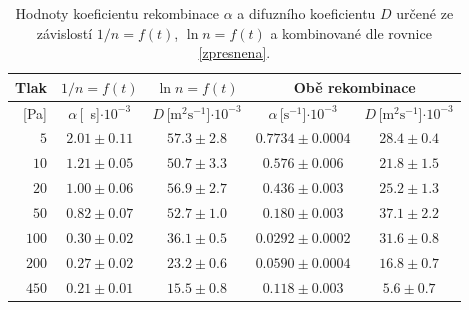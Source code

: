 \documentclass[a4paper,12pt]{article}
\begin{document}
\begin{table}[h]
	\centering
	\caption{Hodnoty koeficientu rekombinace $\alpha$ a difuzního koeficientu 
	$D$ určené ze závislostí $1/n = f(t)$, $\ln n = f(t)$ a kombinované dle 
	rovnice \eqref{zpresnena}.}
	\label{table:koef}
	\begin{tabular}{|r|c|c|c|c|}
		\hline
		Tlak    & $1/n = f(t)$      & $\ln n = f(t)$ & 
		\multicolumn{2}{c|}{Obě rekombinace}                                \\ 
		\hline
		{[}Pa{]} & 
		$\alpha$\,[\si{\per\second}]$\cdot10^{-3}$ & 
		$D$\,[$\si{\metre^2\second^{-1}}$]$\cdot10^{-3}$              & 
		$\alpha$\,[$\si{\second^{-1}}$]$\cdot10^{-3}$ & 
		$D$\,[$\si{\metre^2\second^{-1}}$]$\cdot10^{-3}$ \\ 
		\hline
		$5$                              &$ 2.01                 \pm 
		0.11                $&$ 57.3              \pm  2.8              $& 
		$0.7734    
		\pm 0.0004    $&$ 28.4       \pm  0.4       $\\ \hline
		$10$                             & $1.21                 \pm  
		0.05                $&$ 50.7              \pm  3.3              $&$ 
		0.576     
		\pm 0.006     $&$ 21.8       \pm  1.5       $\\ \hline
		$20                             $&$ 1.00                 \pm  
		0.06                $&$ 56.9              \pm  2.7              $&$ 
		0.436     
		\pm 0.003     $&$ 25.2       \pm  1.3       $\\ \hline
		$50                             $&$ 0.82                 \pm  
		0.07                $&$ 52.7              \pm  1.0              $&$ 
		0.180     
		\pm 0.003     $&$ 37.1       \pm  2.2       $\\ \hline
		$100                            $&$ 0.30                 \pm  
		0.02                $&$ 36.1              \pm  0.5              $& 
		$0.0292    
		\pm 0.0002    $&$ 31.6       \pm  0.8       $\\ \hline
		$200                            $&$ 0.27                 \pm  
		0.02                $&$ 23.2              \pm  0.6              $& 
		$0.0590    
		\pm 0.0004    $&$ 16.8       \pm  0.7       $\\ \hline
		$450                            $&$ 0.21                 \pm  
		0.01                $&$ 15.5              \pm  0.8              $& 
		$0.118     
		\pm 0.003     $&$ 5.6        \pm  0.7       $\\ \hline
	\end{tabular}
\end{table}
\clearpage
\end{document}
